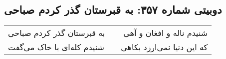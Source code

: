 \begin{center}
\section*{دوبیتی شماره ۳۵۷: به قبرستان گذر کردم صباحی}
\label{sec:357}
\begin{longtable}{l p{0.5cm} r}
به قبرستان گذر کردم صباحی
&&
شنیدم ناله و افغان و آهی
\\
شنیدم کله‌ای با خاک می‌گفت
&&
که این دنیا نمی‌ارزد بکاهی
\\
\end{longtable}
\end{center}
